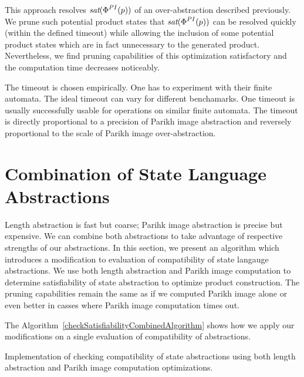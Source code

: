 This approach resolves $\emph{sat}(\emph{$\Phi$}^{PI}(p))$ of an over-abstraction described previously. We prune such potential product states that $\emph{sat}(\emph{$\Phi$}^{PI}(p))$ can be resolved quickly (within the defined timeout) while allowing the inclusion of some potential product states which are in fact unnecessary to the generated product. Nevertheless, we find pruning capabilities of this optimization satisfactory and the computation time decreases noticeably.

The timeout is chosen empirically. One has to experiment with their finite automata. The ideal timeout can vary for different benchamarks. One timeout is usually successfully usable for operations on similar finite automata. The timeout is directly proportional to a precision of Parikh image abstraction and reversely proportional to the scale of Parikh image over-abstraction.


\section{Combination of State Language Abstractions}

Length abstraction is fast but coarse; Parihk image abstraction is precise but expensive. We can combine both abstractions to take advantage of respective strengths of our abstractions. In this section, we present an algorithm which introduces a modification to evaluation of compatibility of state langauge abstractions. We use both length abstraction and Parikh image computation to determine satisfiability of state abstraction to optimize product construction. The pruning capabilities remain the same as if we computed Parikh image alone or even better in casses where Parikh image computation times out.

The Algorithm~\ref{checkSatisfiabilityCombinedAlgorithm} shows how we apply our modifications on a single evaluation of compatibility of abstractions.

\begin{algorithm}[ht]
\caption{Implementation of checking compatibility of state abstractions using both length abstraction and Parikh image computation optimizations.}\label{checkSatisfiabilityCombinedAlgorithm}



\DontPrintSemicolon

\end{algorithm}

